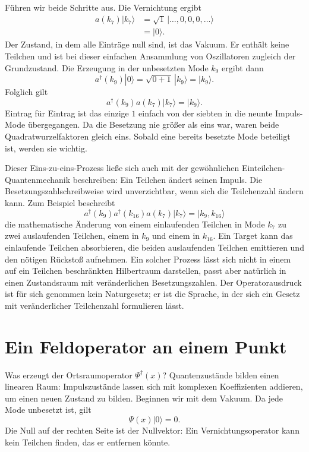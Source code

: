 Führen wir beide Schritte aus. Die Vernichtung ergibt
\begin{align}
a(k_7)|k_7\rangle
&=
\sqrt{1}\,|\ldots,0,0,0,\ldots\rangle\\
&=|0\rangle.
\end{align}
Der Zustand, in dem alle Einträge null sind, ist das Vakuum. Er enthält keine Teilchen und ist bei dieser einfachen Ansammlung von Oszillatoren zugleich der Grundzustand. Die Erzeugung in der unbesetzten Mode \(k_9\) ergibt dann
\begin{equation}
a^\dagger(k_9)|0\rangle
=\sqrt{0+1}\,|k_9\rangle
=|k_9\rangle.
\end{equation}
Folglich gilt
\begin{equation}
a^\dagger(k_9)a(k_7)|k_7\rangle=|k_9\rangle.
\end{equation}
Eintrag für Eintrag ist das einzige \(1\) einfach von der siebten in die neunte Impuls-Mode übergegangen. Da die Besetzung nie größer als eins war, waren beide Quadratwurzelfaktoren gleich eins. Sobald eine bereits besetzte Mode beteiligt ist, werden sie wichtig.

Dieser Eins-zu-eins-Prozess ließe sich auch mit der gewöhnlichen Einteilchen-Quantenmechanik beschreiben: Ein Teilchen ändert seinen Impuls. Die Besetzungszahlschreibweise wird unverzichtbar, wenn sich die Teilchenzahl ändern kann. Zum Beispiel beschreibt
\begin{equation}
a^\dagger(k_9)a^\dagger(k_{16})a(k_7)|k_7\rangle
=|k_9,k_{16}\rangle
\end{equation}
die mathematische Änderung von einem einlaufenden Teilchen in Mode \(k_7\) zu zwei auslaufenden Teilchen, einem in \(k_9\) und einem in \(k_{16}\). Ein Target kann das einlaufende Teilchen absorbieren, die beiden auslaufenden Teilchen emittieren und den nötigen Rückstoß aufnehmen. Ein solcher Prozess lässt sich nicht in einem auf ein Teilchen beschränkten Hilbertraum darstellen, passt aber natürlich in einen Zustandsraum mit veränderlichen Besetzungszahlen. Der Operatorausdruck ist für sich genommen kein Naturgesetz; er ist die Sprache, in der sich ein Gesetz mit veränderlicher Teilchenzahl formulieren lässt.

\section{Ein Feldoperator an einem Punkt}

Was erzeugt der Ortsraumoperator \(\Psi^\dagger(x)\)? Quantenzustände bilden einen linearen Raum: Impulszustände lassen sich mit komplexen Koeffizienten addieren, um einen neuen Zustand zu bilden. Beginnen wir mit dem Vakuum. Da jede Mode unbesetzt ist, gilt
\begin{equation}
\Psi(x)|0\rangle=0.
\end{equation}
Die Null auf der rechten Seite ist der Nullvektor: Ein Vernichtungsoperator kann kein Teilchen finden, das er entfernen könnte.

